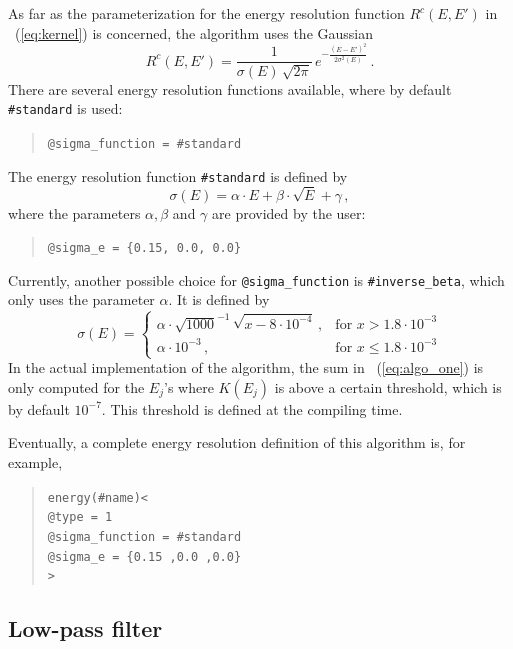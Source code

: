 As far as the parameterization for the energy resolution function 
$R^c(E,E')$ in \eq~(\ref{eq:kernel}) is concerned, the algorithm uses
the Gaussian
\begin{equation}
R^c(E,E')=\frac{1}{\sigma(E)\,\sqrt{2\pi}}\,e^{-\frac{(E-E')^2}{2\sigma^2(E)}} \, .
\end{equation} 
There are several energy resolution functions available, where by default
{\tt \#standard} is used:
\begin{quote}
{\tt \tb @sigma\_function = \#standard} 
\end{quote}
The energy resolution function {\tt \#standard} is defined by
\begin{equation}
\label{eq:sigma_e}
\sigma(E)=\alpha\cdot E + \beta \cdot \sqrt{E} +\gamma\, ,
\end{equation}
where the parameters $\alpha, \beta$ and $\gamma$ are provided by the user:
\begin{quote}
{\tt \tb @sigma\_e = \{0.15, 0.0, 0.0\}}
\end{quote}
Currently, another possible choice for {\tt @sigma\_function} is {\tt \#inverse\_beta},
which only uses the parameter $\alpha$. It is defined by
\begin{equation}
\sigma(E)= \left\{\begin{array}{cl}
 \alpha \cdot \sqrt{1000}^{-1}\,\sqrt{x-8\cdot10^{-4}}\,,&\mathrm{for}\,\, 
x>1.8\cdot10^{-3}\\
\alpha\cdot10^{-3} \,,&\mathrm{for}\,\, x \leq 1.8\cdot10^{-3}
\end{array} \right.
\end{equation}
In the actual implementation of the algorithm,  the sum in \eq~(\ref{eq:algo_one}) is only computed for the $E_j$'s where $K(E_j)$ 
is above a certain threshold, which is by default $10^{-7}$. 
This threshold is defined at the compiling time. 

Eventually,  a complete energy resolution definition of this 
algorithm is, for example,
\begin{quote}
{\tt energy(\#name)<\\
\tb @type = 1\\
\tb @sigma\_function = \#standard\\
\tb @sigma\_e = \{0.15 ,0.0 ,0.0\}\\
>
}
\end{quote}

\subsection{Low-pass filter}

